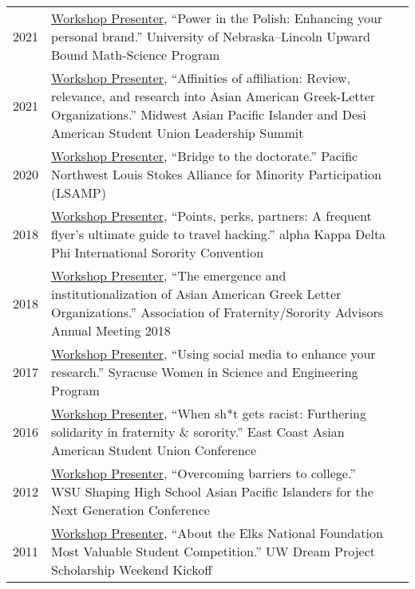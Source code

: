 \documentclass[11pt]{article}
\begin{document}
{{\begin{longtable}{Rp{0.75in}p{5.0in}}
\footnotesize{2021} &
\href{https://newsroom.unl.edu/announce/trio-ubms/11966/73616}{Workshop Presenter}, ``Power in the Polish: Enhancing your personal brand.'' University of Nebraska–Lincoln Upward Bound Math-Science Program\\

\footnotesize{2021} &
\href{https://www.maasuls2021.org/workshops}{Workshop Presenter}, ``Affinities of affiliation: Review, relevance, and research into Asian American Greek-Letter Organizations.'' Midwest Asian Pacific Islander and Desi American Student Union Leadership Summit\\

\footnotesize{2020} & \href{https://depts.washington.edu/lsamp/}{Workshop Presenter}, ``Bridge to the doctorate.'' Pacific Northwest Louis Stokes Alliance for Minority Participation (LSAMP)\\

\footnotesize{2018} & \href{https://web.archive.org/web/20190722125246/http://www.akdphi.org/workshops}{Workshop Presenter}, ``Points, perks, partners: A frequent flyer's ultimate guide to travel hacking.'' alpha Kappa Delta Phi International Sorority Convention\\

\footnotesize{2018} & \href{https://issuu.com/afa1976/docs/afaam-2018-programbook-final-noblee}{Workshop Presenter}, ``The emergence and institutionalization of Asian American Greek Letter Organizations.'' Association of Fraternity/Sorority Advisors Annual Meeting 2018\\

\footnotesize{2017} & \href{http://www.suwise.syr.edu/}{Workshop Presenter}, ``Using social media to enhance your research.'' Syracuse Women in Science and Engineering Program\\

\footnotesize{2016} & \href{https://web.archive.org/web/20160302043700/http://www.ecaasu2016.org/}{Workshop Presenter}, ``When sh*t gets racist: Furthering solidarity in fraternity \& sorority.'' East Coast Asian American Student Union Conference\\

\footnotesize{2012} & \href{https://shaping.wsu.edu/}{Workshop Presenter}, ``Overcoming barriers to college.'' WSU Shaping High School Asian Pacific Islanders for the Next Generation Conference\\

\footnotesize{2011} & \href{https://www.washington.edu/dreamproject/}{Workshop Presenter}, ``About the Elks National Foundation Most Valuable Student Competition.'' UW Dream Project Scholarship Weekend Kickoff\\


\end{longtable}}}
\end{document}
